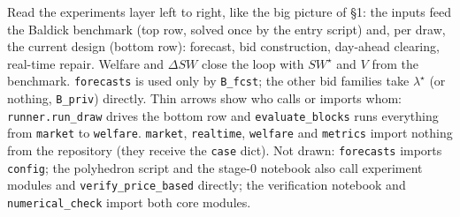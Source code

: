 \documentclass[10pt,a4paper]{article}
\newcommand{\code}[1]{\texttt{#1}}
\begin{document}
\begin{center}
\end{center}
{\small Read the experiments layer left to right, like the big picture of \S1: the inputs feed the Baldick
benchmark (top row, solved once by the entry script) and, per draw, the current design (bottom row):
forecast, bid construction, day-ahead clearing, real-time repair. Welfare and $\Delta SW$ close the loop with
$SW^\star$ and $V$ from the benchmark. \code{forecasts} is used only by \code{B\_fcst}; the other bid families
take $\lambda^\star$ (or nothing, \code{B\_priv}) directly. Thin arrows show who calls or imports whom:
\code{runner.run\_draw} drives the bottom row and \code{evaluate\_blocks} runs everything from \code{market}
to \code{welfare}. \code{market}, \code{realtime}, \code{welfare} and \code{metrics} import nothing from the
repository (they receive the \code{case} dict). Not drawn: \code{forecasts} imports \code{config}; the
polyhedron script and the stage-0 notebook also call experiment modules and \code{verify\_price\_based}
directly; the verification notebook and \code{numerical\_check} import both core modules.}
\end{document}
